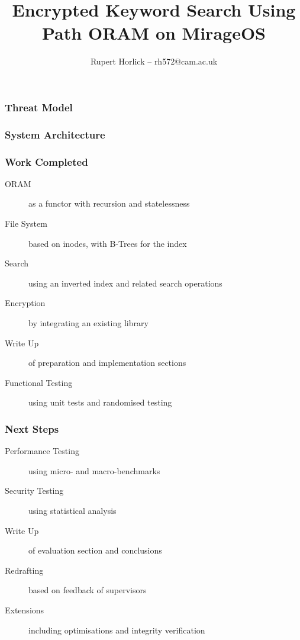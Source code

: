 \documentclass{beamer}
\title{Encrypted Keyword Search Using \\ Path ORAM on MirageOS}
\author{Rupert Horlick -- rh572@cam.ac.uk}
\begin{document}
\begin{frame}
  \maketitle
\end{frame}

\begin{frame}
  \frametitle{Threat Model}
    \setlength{\unitlength}{0.6mm}
    
\end{frame}

\begin{frame}
  \frametitle{System Architecture}
    \setlength{\unitlength}{0.6mm}
    
\end{frame}

\begin{frame}
  \frametitle{Work Completed}
    \begin{description}
      \item[ORAM] as a functor with recursion and statelessness
      \item[File System] based on inodes, with B-Trees for the index
      \item[Search] using an inverted index and related search operations
      \item[Encryption] by integrating an existing library
      \item[Write Up] of preparation and implementation sections
      \item[Functional Testing] using unit tests and randomised testing
    \end{description}
\end{frame}

\begin{frame}
  \frametitle{Next Steps}
    \begin{description}
      \item[Performance Testing] using micro- and macro-benchmarks
      \item[Security Testing] using statistical analysis
      \item[Write Up] of evaluation section and conclusions
      \item[Redrafting] based on feedback of supervisors
      \item[Extensions] including optimisations and integrity verification
    \end{description}
\end{frame}
\end{document}
